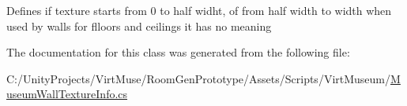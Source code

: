 Defines if texture starts from 0 to half widht, of from half width to width when used by walls for flloors and ceilings it has no meaning 



The documentation for this class was generated from the following file\+:\begin{DoxyCompactItemize}
\item 
C\+:/\+Unity\+Projects/\+Virt\+Muse/\+Room\+Gen\+Prototype/\+Assets/\+Scripts/\+Virt\+Museum/\mbox{\hyperlink{_museum_wall_texture_info_8cs}{Museum\+Wall\+Texture\+Info.\+cs}}\end{DoxyCompactItemize}
